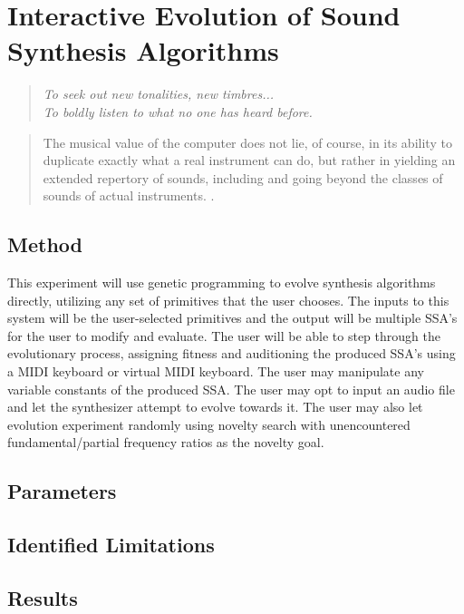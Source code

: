 \documentclass[12pt]{article}
\begin{document}
\section{Interactive Evolution of Sound Synthesis Algorithms}
\begin{quote}
\emph{To seek out new tonalities, new timbres... \\
To boldly listen to what no one has heard before.} \citep{sethares2004tuning}
\end{quote}
\begin{quote}
The musical value of the computer does not lie, of course, in its ability to duplicate exactly what a real instrument can do, but rather in yielding an extended repertory of sounds, including and going beyond the classes of sounds of actual instruments. \citep{risset1969analysis}.
\end{quote}
\subsection{Method}
This experiment will use genetic programming to evolve synthesis algorithms directly, utilizing any set of primitives that the user chooses. The inputs to this system will be the user-selected primitives and the output will be multiple SSA's for the user to modify and evaluate. The user will be able to step through the evolutionary process, assigning fitness and auditioning the produced SSA's using a MIDI keyboard or virtual MIDI keyboard. The user may manipulate any variable constants of the produced SSA. The user may opt to input an audio file and let the synthesizer attempt to evolve towards it. The user may also let evolution experiment randomly using novelty search with unencountered fundamental/partial frequency ratios as the novelty goal.
\subsection{Parameters}
\subsection{Identified Limitations}
\subsection{Results}
\end{document}
